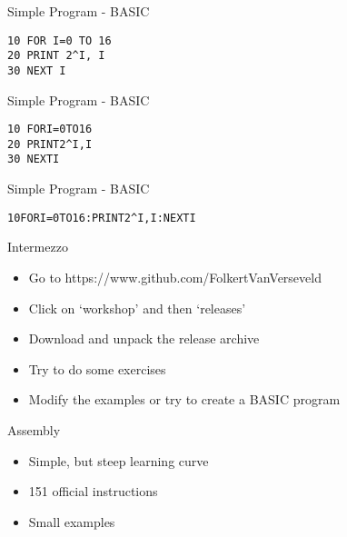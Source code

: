 \documentclass[aspectratio=43]{uva-inf-presentation}
\begin{document}

\begin{frame}[fragile]{Simple Program - BASIC}

\begin{lstlisting}
10 FOR I=0 TO 16
20 PRINT 2^I, I
30 NEXT I
\end{lstlisting}

\end{frame}


\begin{frame}[fragile]{Simple Program - BASIC}

\begin{lstlisting}
10 FORI=0TO16
20 PRINT2^I,I
30 NEXTI
\end{lstlisting}

\end{frame}


\begin{frame}[fragile]{Simple Program - BASIC}

\begin{lstlisting}
10FORI=0TO16:PRINT2^I,I:NEXTI
\end{lstlisting}

\end{frame}


\begin{frame}{Intermezzo}

\begin{itemize}
\item Go to https://www.github.com/FolkertVanVerseveld
\item Click on `workshop' and then `releases'
\item Download and unpack the release archive
\item Try to do some exercises
\item Modify the examples or try to create a BASIC program
\end{itemize}

\end{frame}


\begin{frame}{Assembly}

\begin{itemize}
\item Simple, but steep learning curve
\item 151 official instructions
\item Small examples
\end{itemize}

\end{frame}
\end{document}
